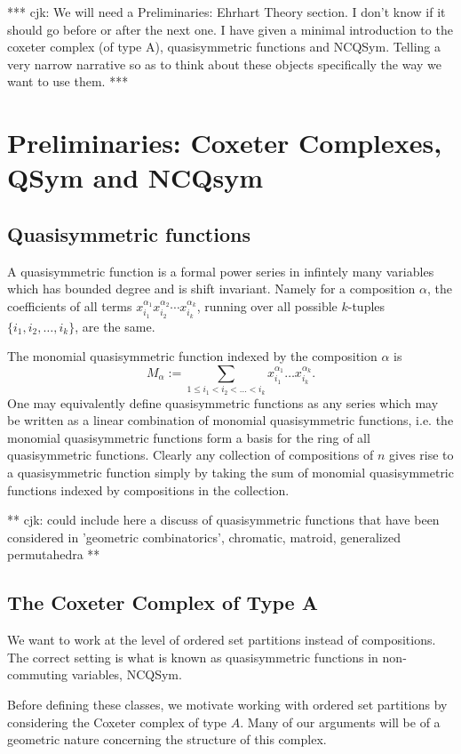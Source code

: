 \documentclass[11pt,letter]{amsart}
\begin{document}
*** cjk: We will need a Preliminaries: Ehrhart Theory section.  I don't know if it should go before or after the next one.
I have given a minimal introduction to the coxeter complex (of type A), quasisymmetric functions and NCQSym.  Telling a very narrow narrative so as to think about these objects specifically the way we want to use them. ***



\section{Preliminaries: Coxeter Complexes, QSym and NCQsym}

\subsection{Quasisymmetric functions}
A quasisymmetric function is a formal power series in infintely many
variables which has bounded degree and is shift invariant.  Namely for
a composition $\alpha$, the coefficients of all terms
$x_{i_1}^{\alpha_1}x_{i_2}^{\alpha_2} \cdots x_{i_k}^{\alpha_k}$,
running over all possible $k$-tuples $\{i_1, i_2, \ldots, i_k \}$, are
the same.


The monomial quasisymmetric function indexed by the composition $\alpha$ is 
$$M_{\alpha} := \sum_{1 \leq i_1 < i_2 < \ldots < i_k}
x_{i_1}^{\alpha_1} \ldots x_{i_k}^{\alpha_k}.$$  One may equivalently
define quasisymmetric functions as any series which may be written as a
linear combination of monomial quasisymmetric functions, i.e. the
monomial quasisymmetric functions form a basis for the ring of all
quasisymmetric functions.  Clearly any collection of
compositions of $n$ gives rise to a quasisymmetric function simply by
taking the sum of monomial quasisymmetric functions indexed by
compositions in the collection.

** cjk: could include here a discuss of quasisymmetric functions that have
been considered in 'geometric combinatorics', chromatic, matroid,
generalized permutahedra **

\subsection{The Coxeter Complex of Type A}
We want to work at the level of ordered set partitions instead of
compositions.  The correct setting is what is known as 
quasisymmetric functions in non-commuting variables, NCQSym.

Before defining these classes, we motivate working with ordered set
partitions by considering the Coxeter complex of type $A$.  Many of
our arguments will be of a geometric nature concerning the structure
of this complex.
\end{document}
